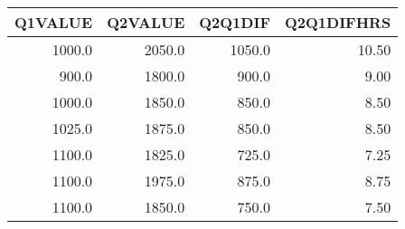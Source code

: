 \begin{tabular}{rrrr}
\toprule
 Q1VALUE &  Q2VALUE &  Q2Q1DIF &  Q2Q1DIFHRS \\
\midrule
  1000.0 &   2050.0 &   1050.0 &       10.50 \\
   900.0 &   1800.0 &    900.0 &        9.00 \\
  1000.0 &   1850.0 &    850.0 &        8.50 \\
  1025.0 &   1875.0 &    850.0 &        8.50 \\
  1100.0 &   1825.0 &    725.0 &        7.25 \\
  1100.0 &   1975.0 &    875.0 &        8.75 \\
  1100.0 &   1850.0 &    750.0 &        7.50 \\
\bottomrule
\end{tabular}
